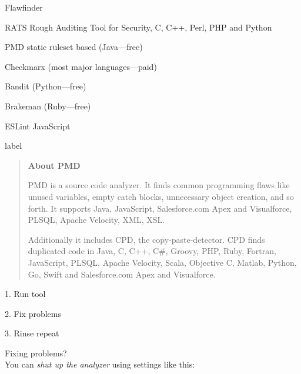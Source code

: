 \documentclass[Screen16to9,17pt]{foils}
\begin{document}
\begin{list1}
\item Flawfinder 
\item RATS Rough Auditing Tool for Security, C, C++, Perl, PHP and Python
\item PMD static ruleset based (Java—free)
\item Checkmarx (most major languages—paid)
\item Bandit (Python—free)
\item Brakeman (Ruby—free)
\item ESLint JavaScript 
\item {\small {}}
\end{list1}label


\begin{quote}{\bf
About PMD}

PMD is a source code analyzer. It finds common programming flaws like unused variables, empty catch blocks, unnecessary object creation, and so forth. It supports Java, JavaScript, Salesforce.com Apex and Visualforce, PLSQL, Apache Velocity, XML, XSL.

Additionally it includes CPD, the copy-paste-detector. CPD finds duplicated code in Java, C, C++, C\#, Groovy, PHP, Ruby, Fortran, JavaScript, PLSQL, Apache Velocity, Scala, Objective C, Matlab, Python, Go, Swift and Salesforce.com Apex and Visualforce.
\end{quote}

\begin{list1}
\item {}
\end{list1}




\begin{list1}
\item 1. Run tool
\item 2. Fix problems
\item 3. Rinse repeat
\end{list1}

Fixing problems?\\
You can \emph{shut up the analyzer} using settings like this:
\end{document}
